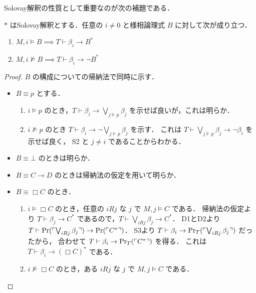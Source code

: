 \documentclass{jlreq}
\begin{document}
Solovay解釈の性質として重要なのが次の補題である．

\begin{lemma}\label{lem:solovay_interpretation}
	$*$ はSolovay解釈とする．任意の $i \neq 0$ と様相論理式 $B$ に対して次が成り立つ．
	\begin{enumerate}
		\item $M, i \vDash B \implies T \vdash \beta_i \to B^*$
		\item $M, i \nvDash B \implies T \vdash \beta_i \to \lnot B^*$
	\end{enumerate}
\end{lemma}
\begin{proof}
	$B$ の構成についての帰納法で同時に示す．
	\begin{itemize}
		\item
		      $B \equiv p$ とする．
		      \begin{enumerate}
			      \item
			            $i \vDash p$ のとき，$T \vdash \beta_i \to \bigvee_{j \Vdash p} \beta_j $ を示せば良いが，これは明らか．
			      \item
			            $i \nvDash p$ のとき $T \vdash \beta_i \to \lnot \bigvee_{j \Vdash p} \beta_j$ を示す．
			            これは $T \vdash \bigvee_{j \Vdash p} \beta_j \to \lnot \beta_i$ を示せば良く，
			            S2 と $j \neq i$ であることからわかる．
		      \end{enumerate}
		\item $B \equiv \bot$ のときは明らか．
		\item $B \equiv C \to D$ のときは帰納法の仮定を用いて明らか．
		\item
		      $B \equiv \Box C$ のとき．
		      \begin{enumerate}
			      \item
			            $i \vDash \Box C$ のとき，任意の $i R j$ な $j$ で $M, j \vDash C$ である．
			            帰納法の仮定より $T \vdash \beta_j \to C^*$ であるので，$T \vdash \bigvee_{i R j} \beta_j \to C^*$．
			            D1とD2より $T \vdash \mathrm{Pr}(\ulcorner \bigvee_{i R j} \beta_j \urcorner) \to \mathrm{Pr}(\ulcorner C^* \urcorner)$．
			            S3より $T \vdash \beta_i \to \mathrm{Pr}_T(\ulcorner \bigvee_{i R j} \beta_j \urcorner)$ だったから，
			            合わせて $T \vdash \beta_i \to \mathrm{Pr}_T(\ulcorner C^* \urcorner)$ を得る．
			            これは $T \vdash \beta_i \to (\Box C)^*$ である．
			      \item
			            $i \nvDash \Box C$ のとき，ある $i R j$ な $j$ で $M, j \vDash C$ である．

\end{enumerate}
\end{itemize}
\end{proof}
\end{document}
